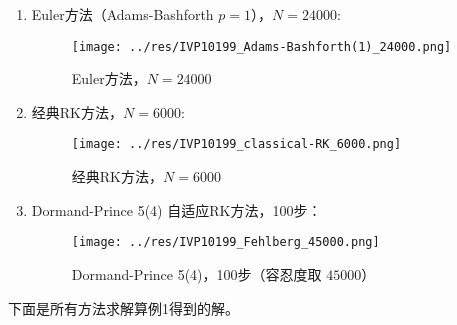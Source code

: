 \documentclass[lang=cn,a4paper,newtx,bibend=bibtex]{elegantpaper}
\begin{document}
\begin{enumerate}
    \item Euler方法（Adams-Bashforth $p=1$），$N=24000$:
        \begin{figure}[H]
            \centering
                \texttt{[image: ../res/IVP10199\_Adams-Bashforth(1)\_24000.png]}
                \caption{Euler方法，$N=24000$}
        \end{figure}
    \item 经典RK方法，$N=6000$:
        \begin{figure}[H]
            \centering
                \texttt{[image: ../res/IVP10199\_classical-RK\_6000.png]}
                \caption{经典RK方法，$N=6000$}     
        \end{figure}
    \item Dormand-Prince 5(4) 自适应RK方法，100步：
        \begin{figure}[H]
            \centering
                \texttt{[image: ../res/IVP10199\_Fehlberg\_45000.png]}
                \caption{Dormand-Prince 5(4)，100步（容忍度取 $45000$）}                
        \end{figure}
\end{enumerate}

下面是所有方法求解算例1得到的解。
\end{document}
